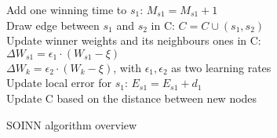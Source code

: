 \begin{algorithm}[H]
    {Add one winning time to $s_1$: $M_{s1} = M_{s1} + 1$ \\
    Draw edge between $s_1$ and $s_2$ in C: $C = C \cup (s_1,s_2)$ \\
    Update winner weights and its neighbours ones in C: \\
    $\Delta W_{s1} = \epsilon_1 \cdot (W_{s1} - \xi)$ \\
    $\Delta W_k = \epsilon_2 \cdot (W_k - \xi)$, with $\epsilon_1, \epsilon_2$ as two learning rates \\
    Update local error for $s_1$: $E_{s1} = E_{s1} + d_1$ \\
    Update C based on the distance between new nodes \\
    }
    \caption{SOINN algorithm overview}
\end{algorithm}